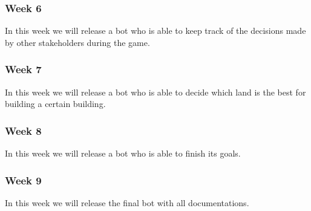 \subsubsection{Week 6}
In this week we will release a bot who is able to keep track of the decisions made by other stakeholders during the game.

\subsubsection{Week 7}
In this week we will release a bot who is able to decide which land is the best for building a certain building.

\subsubsection{Week 8}
In this week we will release a bot who is able to finish its goals.

\subsubsection{Week 9}
In this week we will release the final bot with all documentations.
\newpage
